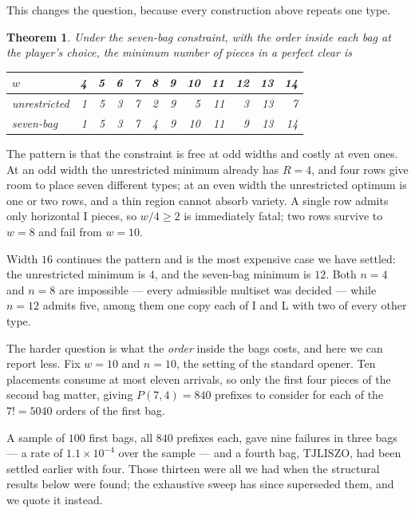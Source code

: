 \documentclass[11pt,a4paper]{article}
\theoremstyle{plain}
\newtheorem{theorem}{Theorem}
\theoremstyle{definition}
\theoremstyle{remark}
\begin{document}
This changes the question, because every construction above repeats one type.

\begin{theorem}
\label{thm:bag}
Under the seven-bag constraint, with the order inside each bag at the player's
choice, the minimum number of pieces in a perfect clear is
\begin{center}
\begin{tabular}{lrrrrrrrrrrr}
\toprule
$w$ & 4 & 5 & 6 & 7 & 8 & 9 & 10 & 11 & 12 & 13 & 14 \\
\midrule
unrestricted & 1 & 5 & 3 & 7 & 2 & 9 & 5 & 11 & 3 & 13 & 7 \\
seven-bag & 1 & 5 & 3 & 7 & 4 & 9 & 10 & 11 & 9 & 13 & 14 \\
\bottomrule
\end{tabular}
\end{center}
\end{theorem}

The pattern is that the constraint is free at odd widths and costly at even ones. At
an odd width the unrestricted minimum already has $R = 4$, and four rows give room to
place seven different types; at an even width the unrestricted optimum is one or two
rows, and a thin region cannot absorb variety. A single row admits only horizontal I
pieces, so $w/4 \geq 2$ is immediately fatal; two rows survive to $w = 8$ and fail
from $w = 10$.

Width $16$ continues the pattern and is the most expensive case we have settled: the
unrestricted minimum is $4$, and the seven-bag minimum is $12$. Both $n = 4$ and
$n = 8$ are impossible --- every admissible multiset was decided --- while $n = 12$
admits five, among them one copy each of I and L with two of every other type.

\smallskip
The harder question is what the \emph{order} inside the bags costs, and here we can
report less. Fix $w = 10$ and $n = 10$, the setting of the standard opener. Ten
placements consume at most eleven arrivals, so only the first four pieces of the
second bag matter, giving $P(7,4) = 840$ prefixes to consider for each of the
$7! = 5040$ orders of the first bag.

A sample of $100$ first bags, all $840$ prefixes each, gave nine failures in three
bags --- a rate of $1.1 \times 10^{-4}$ over the sample --- and a fourth bag,
$\mathrm{TJLISZO}$, had been settled earlier with four. Those thirteen were all we had
when the structural results below were found; the exhaustive sweep has since
superseded them, and we quote it instead.
\end{document}
